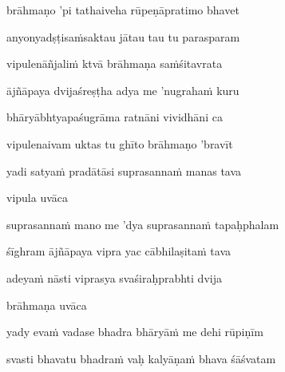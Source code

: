 brāhmaṇo 'pi tathaiveha rūpeṇāpratimo bhavet \veg\dontdisplaylinenum
{}

anyonyadṣṭisaṁsaktau jātau tau tu parasparam\thinspace{\dandab} \dontdisplaylinenum

vipulenāñjaliṁ ktvā brāhmaṇa saṁśitavrata \veg\dontdisplaylinenum

ājñāpaya dvijaśreṣṭha adya me 'nugrahaṁ kuru\thinspace{\dandab} \dontdisplaylinenum

bhāryābhtyapaśugrāma ratnāni vividhāni ca \veg\dontdisplaylinenum
{}

vipulenaivam uktas tu ghīto brāhmaṇo 'bravīt\thinspace{\dandab} \dontdisplaylinenum

yadi satyaṁ pradātāsi suprasannaṁ manas tava \veg\dontdisplaylinenum
{}

vipula uvāca~{\dandab}\dontdisplaylinenum 

suprasannaṁ mano me 'dya suprasannaṁ tapaḥphalam\thinspace{\danda} \dontdisplaylinenum

śīghram ājñāpaya vipra yac cābhilaṣitaṁ tava \danda\dontdisplaylinenum

adeyaṁ nāsti viprasya svaśiraḥprabhti dvija \veg\dontdisplaylinenum
{}

brāhmaṇa uvāca~{\dandab}\dontdisplaylinenum 
{}

yady evaṁ vadase bhadra bhāryāṁ me dehi rūpiṇīm\thinspace{\danda} \dontdisplaylinenum

svasti bhavatu bhadraṁ vaḥ kalyāṇaṁ bhava śāśvatam \veg\dontdisplaylinenum
{}


